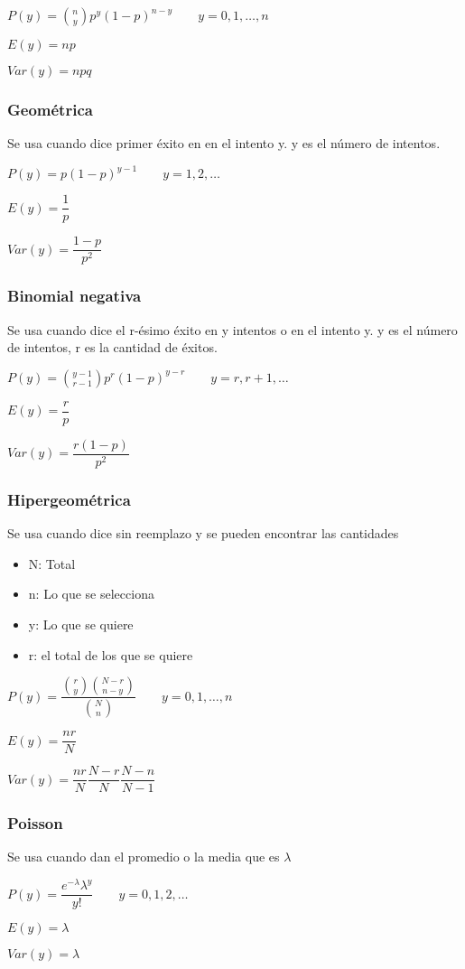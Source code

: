$P(y)=\binom{n}{y}p^y(1-p)^{n-y}\qquad y=0,1,\dots,n$

$E(y)=np$

$Var(y)=npq$
\subsubsection{Geométrica}
Se usa cuando dice primer éxito en en el intento y. y es el número de intentos.

$P(y)=p(1-p)^{y-1}\qquad y=1,2,\dots$

$E(y)=\dfrac{1}{p}$

$Var(y)=\dfrac{1-p}{p^2}$
\subsubsection{Binomial negativa}
Se usa cuando dice el r-ésimo éxito en y intentos o en el intento y. y es el número de intentos, r es la cantidad de éxitos.

$P(y)=\binom{y-1}{r-1}p^r(1-p)^{y-r}\qquad y=r,r+1,\dots$

$E(y)=\dfrac{r}{p}$

$Var(y)=\dfrac{r(1-p)}{p^2}$

\subsubsection{Hipergeométrica}
Se usa cuando dice sin reemplazo y se pueden encontrar las cantidades
\begin{itemize}
	\item N: Total
	\item n: Lo que se selecciona
	\item y: Lo que se quiere
	\item r: el total de los que se quiere
\end{itemize}
$P(y)=\dfrac{\binom{r}{y}\binom{N-r}{n-y}}{\binom{N}{n}}\qquad y=0,1,\dots,n$

$E(y)=\dfrac{nr}{N}$

$Var(y)=\dfrac{nr}{N}\dfrac{N-r}{N}\dfrac{N-n}{N-1}$

\subsubsection{Poisson}
Se usa cuando dan el promedio o la media que es $\lambda$

$P(y)=\dfrac{e^{-\lambda}\lambda^y}{y!}\qquad y=0,1,2,\dots$

$E(y)=\lambda$

$Var(y)=\lambda$

